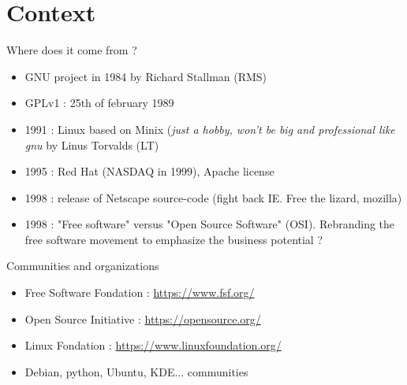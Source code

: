 \documentclass{beamer}
\begin{document}

\section{Context}

\begin{frame}{Where does it come from ?}
  \begin{itemize}
  \item GNU project in 1984 by Richard Stallman (RMS)
  \item GPLv1 : 25th of february 1989
  \item 1991 : Linux based on Minix (\textit{just a hobby, won't be big and professional like gnu} by Linus Torvalds (LT)
  \item 1995 : Red Hat (NASDAQ in 1999), Apache license
  \item 1998 : release of Netscape source-code (fight back IE. Free the lizard, mozilla)
  \item 1998 : "Free software" versus "Open Source Software" (OSI). Rebranding the free software movement to emphasize the business potential ? 
  \end{itemize}
\end{frame}


\begin{frame}[plain]%
%  
\end{frame}


\begin{frame}[plain]%
%  
\end{frame}

\begin{frame}[plain]%
%  
\end{frame}

\begin{frame}{Communities and organizations}
  \begin{itemize}
  \item Free Software Fondation : \url{https://www.fsf.org/}
  \item Open Source Initiative : \url{https://opensource.org/}
  \item Linux Fondation : \url{https://www.linuxfoundation.org/}
  \item Debian, python, Ubuntu, KDE... communities
  \end{itemize}
\end{frame}
\end{document}
